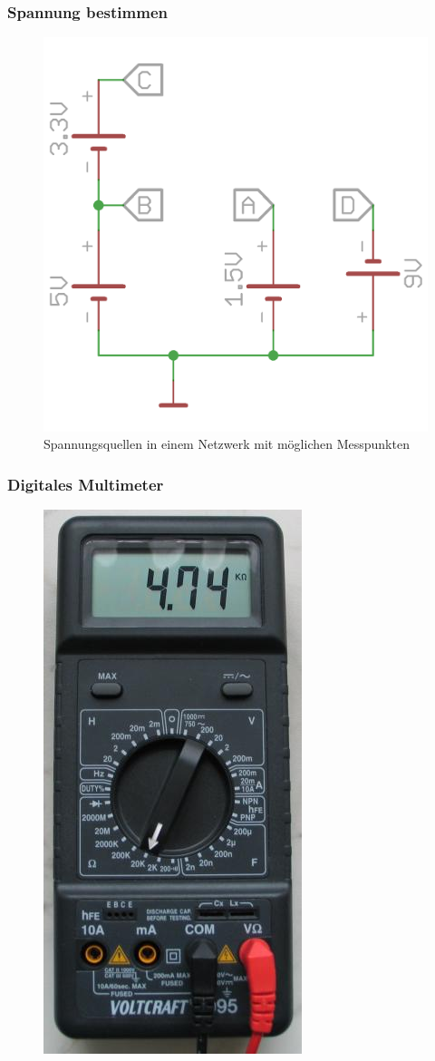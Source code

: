\begin{frame}
  \frametitle{Spannung bestimmen}
  \begin{center}
    \begin{figure}
      \includegraphics[width=.5\textwidth,height=.75\textheight,keepaspectratio]{e02/Spannung.png}
      \caption{Spannungsquellen in einem Netzwerk mit möglichen Messpunkten}
    \end{figure}
  \end{center}
\end{frame}

\begin{frame}
  \frametitle{Digitales Multimeter}
  \begin{center}
    \begin{figure}
      \includegraphics[width=.25\textwidth,height=.75\textheight,keepaspectratio]{e02/digitalmultimeter.jpg}
    \end{figure}
  \end{center}
\end{frame}


